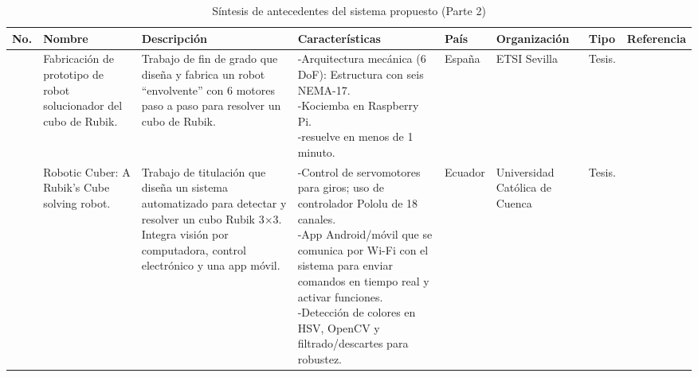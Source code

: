 \begin{sidewaystable}
  \scriptsize
  \centering
  \caption{Síntesis de antecedentes del sistema propuesto (Parte 2)}
  \begin{tabular}{m{5mm} m{25mm} m{45mm} m{40mm} m{15mm} m{18mm} m{12mm} m{14mm}}
    \toprule
    \centering \textbf{No.} & \centering \textbf{Nombre} & \centering \textbf{Descripción} & \centering \textbf{Características} & \centering \textbf{País} & \centering \textbf{Organización} & \centering \textbf{Tipo} & \textbf{Referencia} \\ 
    \midrule
    \centering 4 & \centering Fabricación de prototipo de robot solucionador del cubo de Rubik. & 
    \parbox{45mm}{Trabajo de fin de grado que diseña y fabrica un robot “envolvente” con 6 motores paso a paso para resolver un cubo de Rubik.} & 
    \parbox{40mm}{
        -Arquitectura mecánica (6 DoF): Estructura con seis NEMA-17.\\
        -Kociemba en Raspberry Pi.\\
        -resuelve en menos de 1 minuto.\\
        } & 
    \centering España & \centering ETSI Sevilla & \centering Tesis. &  \\ 
    \midrule
     & \centering Robotic Cuber: A Rubik’s Cube solving robot. & \parbox{45mm}{Trabajo de titulación que diseña un sistema automatizado para detectar y resolver un cubo Rubik 3×3. Integra visión por computadora, control electrónico y una app móvil.} & 
    \parbox{40mm}{
    -Control de servomotores para giros; uso de controlador Pololu de 18 canales.\\
    -App Android/móvil que se comunica por Wi-Fi con el sistema para enviar comandos en tiempo real y activar funciones.\\
    -Detección de colores en HSV, OpenCV y filtrado/descartes para robustez.\\
     }
 & 
    \centering Ecuador & \centering Universidad Católica de Cuenca
 & \centering Tesis. &  \\

\end{tabular}
\end{sidewaystable}
